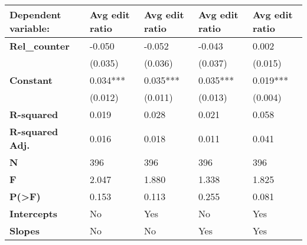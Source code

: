 \begin{tabular}{lllll}
\toprule
\textbf{Dependent variable:} & Avg edit ratio & Avg edit ratio & Avg edit ratio & Avg edit ratio \\
\midrule
\textbf{Rel\_counter   } &         -0.050 &         -0.052 &         -0.043 &          0.002 \\
               &        (0.035) &        (0.036) &        (0.037) &        (0.015) \\
\textbf{Constant      } &       0.034*** &       0.035*** &       0.035*** &       0.019*** \\
               &        (0.012) &        (0.011) &        (0.013) &        (0.004) \\
\textbf{R-squared     } &          0.019 &          0.028 &          0.021 &          0.058 \\
\textbf{R-squared Adj.} &          0.016 &          0.018 &          0.011 &          0.041 \\
\textbf{N             } &            396 &            396 &            396 &            396 \\
\textbf{F             } &          2.047 &          1.880 &          1.338 &          1.825 \\
\textbf{P(>F)         } &          0.153 &          0.113 &          0.255 &          0.081 \\
\textbf{Intercepts    } &             No &            Yes &             No &            Yes \\
\textbf{Slopes        } &             No &             No &            Yes &            Yes \\
\bottomrule
\end{tabular}
